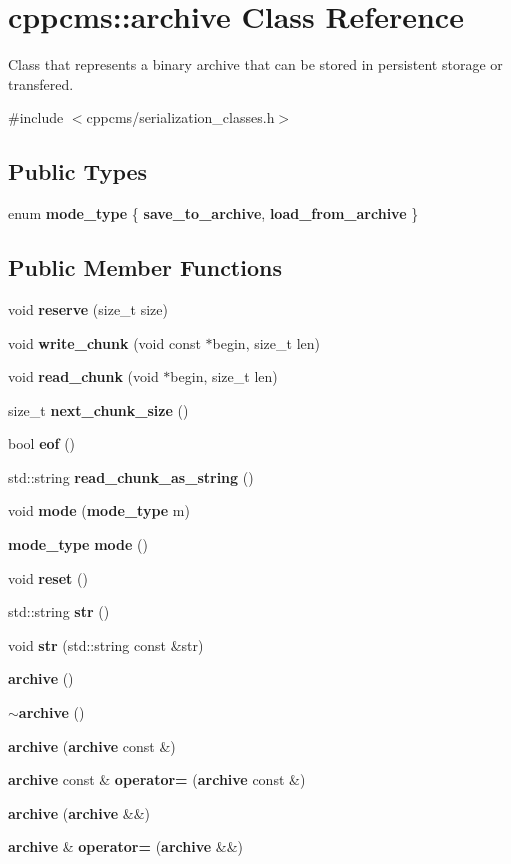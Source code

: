 \section{cppcms\+:\+:archive Class Reference}
\label{classcppcms_1_1archive}


Class that represents a binary archive that can be stored in persistent storage or transfered.  




{\ttfamily \#include $<$cppcms/serialization\+\_\+classes.\+h$>$}

\subsection*{Public Types}
\begin{DoxyCompactItemize}
\item 
enum {\bf mode\+\_\+type} \{ {\bfseries save\+\_\+to\+\_\+archive}, 
{\bfseries load\+\_\+from\+\_\+archive}
 \}
\end{DoxyCompactItemize}
\subsection*{Public Member Functions}
\begin{DoxyCompactItemize}
\item 
void {\bf reserve} (size\+\_\+t size)
\item 
void {\bf write\+\_\+chunk} (void const $\ast$begin, size\+\_\+t len)
\item 
void {\bf read\+\_\+chunk} (void $\ast$begin, size\+\_\+t len)
\item 
size\+\_\+t {\bf next\+\_\+chunk\+\_\+size} ()
\item 
bool {\bf eof} ()
\item 
std\+::string {\bf read\+\_\+chunk\+\_\+as\+\_\+string} ()
\item 
void {\bf mode} ({\bf mode\+\_\+type} m)
\item 
{\bf mode\+\_\+type} {\bf mode} ()
\item 
void {\bf reset} ()
\item 
std\+::string {\bf str} ()
\item 
void {\bf str} (std\+::string const \&str)
\item 
{\bf archive} ()
\item 
{\bf $\sim$archive} ()
\item 
{\bf archive} ({\bf archive} const \&)
\item 
{\bf archive} const \& {\bf operator=} ({\bf archive} const \&)
\item 
{\bf archive} ({\bf archive} \&\&)
\item 
{\bf archive} \& {\bf operator=} ({\bf archive} \&\&)
\end{DoxyCompactItemize}



